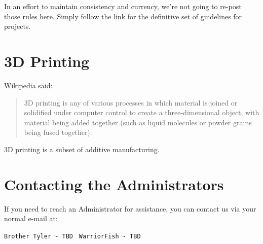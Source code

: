 \documentclass[12pt]{article}
\begin{document}
In an effort to maintain consistency and currency, we're not going to 
re-post those rules here. Simply follow the link for the definitive set 
of guidelines for projects.

\section{3D Printing}

  Wikipedia said:
\begin{quote}
3D printing is any of various processes in which material is joined or 
solidified under computer control to create a three-dimensional object, 
with material being added together (such as liquid molecules or powder 
grains being fused together).
\end{quote}

3D printing is a subset of additive manufacturing.

\section{Contacting the Administrators}


If you need to reach an Administrator for assistance, you can contact 
us via your normal e-mail at:

{\texttt{Brother Tyler -  TBD }}
\medskip
{\texttt{WarriorFish - TBD}}
\end{document}
